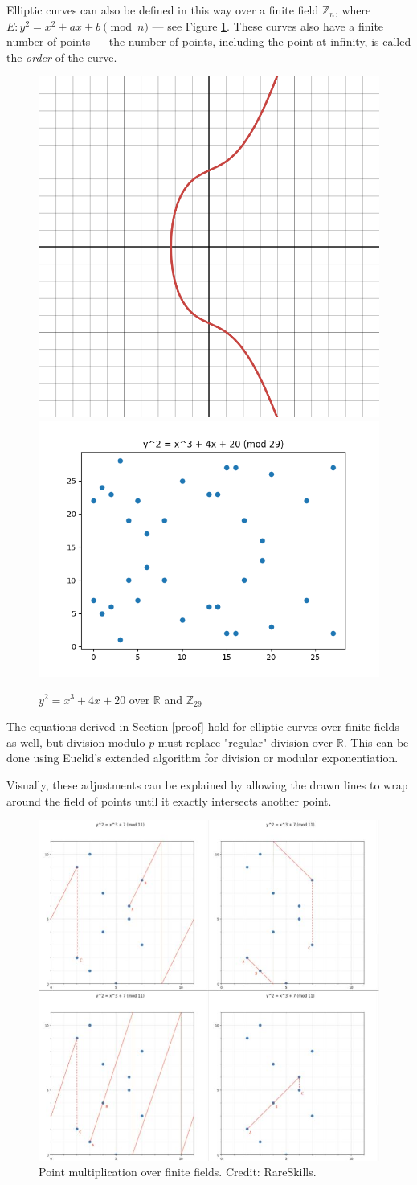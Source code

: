 \documentclass[a4paper]{article}
\begin{document}
Elliptic curves can also be defined in this way over a finite field $\mathbb{Z}_n$, where $E: y^2 = x^2 + ax + b \pmod n$ --- see Figure \ref{fig:finite}. These curves also have a finite number of points --- the number of points, including the point at infinity, is called the \textit{order} of the curve.\cite{guide}

\begin{figure}[h]
    \centering
    \includegraphics[width=0.3\linewidth]{images/finite-graph.png}
    \includegraphics[width=0.4\linewidth]{images/finite-plt.png}
    \caption{$y^2=x^3+4x+20$ over $\mathbb{R}$ and $\mathbb{Z}_{29}$}
    \label{fig:finite}
\end{figure}

The equations derived in Section \ref{proof} hold for elliptic curves over finite fields as well, but division modulo $p$ must replace "regular" division over $\mathbb{R}$. This can be done using Euclid's extended algorithm for division\cite{discrete} or modular exponentiation.

Visually, these adjustments can be explained by allowing the drawn lines to wrap around the field of points until it exactly intersects another point.\cite{rareskills}

\begin{figure}[h]
    \centering
    \includegraphics[width=0.5\linewidth]{images/rareskills-finite.jpg}
    \caption{Point multiplication over finite fields. Credit: RareSkills.}
\end{figure}
\end{document}
